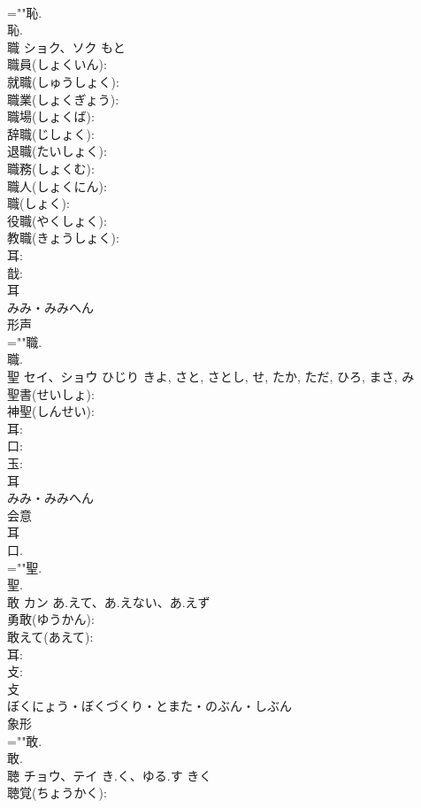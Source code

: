 \documentclass[8pt]{extreport}
\begin{document}
\begin{CJK}{UTF8}{min}
\\	=""恥.
\\	恥.
\\	職	ショク、ソク		もと	
\\	職員(しょくいん): 
\\	就職(しゅうしょく): 
\\	職業(しょくぎょう): 
\\	職場(しょくば): 
\\	辞職(じしょく): 
\\	退職(たいしょく): 
\\	職務(しょくむ): 
\\	職人(しょくにん): 
\\	職(しょく): 
\\	役職(やくしょく): 
\\	教職(きょうしょく): 
\\	耳: 
\\	戠: 
\\	耳	
\\	みみ・みみへん	
\\	形声 
\\	=""職.
\\	職.
\\	聖	セイ、ショウ	ひじり	きよ, さと, さとし, せ, たか, ただ, ひろ, まさ, み	
\\	聖書(せいしょ): 
\\	神聖(しんせい): 
\\	耳: 
\\	口: 
\\	玉: 
\\	耳	
\\	みみ・みみへん	
\\	会意 
\\	耳 
\\	口. 
\\	=""聖.
\\	聖.
\\	敢	カン	あ.えて、あ.えない、あ.えず		
\\	勇敢(ゆうかん): 
\\	敢えて(あえて): 
\\	耳: 
\\	攴: 
\\	攴	
\\	ぼくにょう・ぼくづくり・とまた・のぶん・しぶん	
\\	象形 
\\	=""敢.
\\	敢.
\\	聴	チョウ、テイ	き.く、ゆる.す	きく	
\\	聴覚(ちょうかく): 

\end{CJK}
\end{document}
